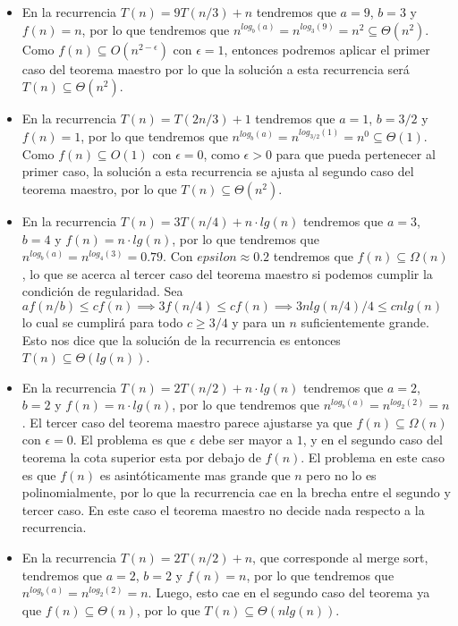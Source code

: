 \begin{itemize}
 \item En la recurrencia $T(n) = 9T(n/3) + n$ tendremos que $a=9$, $b=3$ y $f(n)=n$, por lo que tendremos que $n^{log_b(a)} = n^{log_3(9)} = n^2 \subseteq \Theta(n^2)$. Como $f(n) \subseteq O(n^{2-\epsilon})$ con $\epsilon = 1$, entonces podremos aplicar el primer caso del teorema maestro por lo que la soluci\'on a esta recurrencia ser\'a $T(n) \subseteq \Theta(n^2)$.

 \item En la recurrencia $T(n) = T(2n/3) + 1$ tendremos que $a=1$, $b=3/2$ y $f(n) = 1$, por lo que tendremos que $n^{log_b(a)} = n^{log_{3/2}(1)} = n^0 \subseteq \Theta(1)$. Como $f(n) \subseteq O(1)$ con $\epsilon = 0$, como $\epsilon > 0$ para que pueda pertenecer al primer caso, la soluci\'on a esta recurrencia se ajusta al segundo caso del teorema maestro, por lo que $T(n) \subseteq \Theta(n^2)$.

 \item En la recurrencia $T(n) = 3T(n/4) + n \cdot lg(n)$ tendremos que $a=3$, $b=4$ y $f(n) = n \cdot lg(n)$, por lo que tendremos que $n^{log_b(a)} = n^{log_4(3)} = 0.79$. Con $epsilon \approx 0.2$ tendremos que $f(n) \subseteq \Omega(n)$, lo que se acerca al tercer caso del teorema maestro si podemos cumplir la condici\'on de regularidad. Sea $af(n/b) \leq cf(n) \implies 3f(n/4) \leq cf(n) \implies 3nlg(n/4)/4 \leq cnlg(n)$ lo cual se cumplir\'a para todo $c \geq 3/4$ y para un $n$ suficientemente grande. Esto nos dice que la soluci\'on de la recurrencia es entonces $T(n) \subseteq \Theta(lg(n))$.

 \item En la recurrencia $T(n) = 2T(n/2) + n \cdot lg(n)$ tendremos que $a=2$, $b=2$ y $f(n) = n \cdot lg(n)$, por lo que tendremos que $n^{log_b(a)} = n^{log_2(2)} = n$. El tercer caso del teorema maestro parece ajustarse ya que $f(n) \subseteq \Omega(n)$ con $\epsilon = 0$. El problema es que $\epsilon$ debe ser mayor a $1$, y en el segundo caso del teorema la cota superior esta por debajo de $f(n)$. El problema en este caso es que $f(n)$ es asint\'oticamente mas grande que $n$ pero no lo es polinomialmente, por lo que la recurrencia cae en la brecha entre el segundo y tercer caso. En este caso el teorema maestro no decide nada respecto a la recurrencia.

 \item En la recurrencia $T(n) = 2T(n/2) + n$, que corresponde al merge sort, tendremos que $a=2$, $b=2$ y $f(n) = n$, por lo que tendremos que $n^{log_b(a)} = n^{log_2(2)} = n$. Luego, esto cae en el segundo caso del teorema ya que $f(n) \subseteq \Theta(n)$, por lo que $T(n) \subseteq \Theta(nlg(n))$.
\end{itemize}

